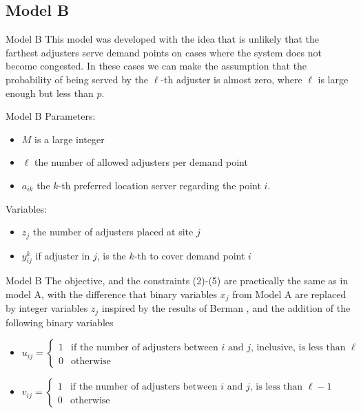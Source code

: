 

\subsection{Model B}
  
\begin{frame}{Model B}
  This model was developed with the idea that is unlikely that
  the farthest adjusters serve demand points on cases where the system does not become congested.
  In these cases we can make the assumption that the probability of being served by the $\ell$-th 
  adjuster is almost zero, where $\ell$ is large enough but less than $p$.

\end{frame}

\begin{frame}{Model B}
  Parameters:
  \begin{itemize}
  \item $M$ is a large integer
  \item $\ell$ the number of allowed adjusters per demand point
  \item $a_{ik}$ the $k$-th preferred location server regarding the point $i$.
  \end{itemize}

  Variables:
  \begin{itemize}
  \item $z_j$ the number of adjusters placed at site $j$
  \item $y_{ij}^k$ if adjuster in $j$, is the $k$-th to cover demand point $i$
  \end{itemize}

\end{frame}

\begin{frame}[allowframebreaks]{Model B}
  The objective, and the constraints (2)-(5) 
  are practically the same as in model A,
  with the difference that binary variables $x_j$ from Model A
  are replaced by integer variables $z_j$ inspired by the results of Berman \cite{berman1987stochastic},
  and the addition of the following binary variables
  {\footnotesize
    \begin{itemize}
    \item $u_{ij} = \begin{cases} 1 & \mbox{if the number of adjusters between } i \mbox{ and } j \mbox{, inclusive, is less than } \ell \\
      0 & \mbox{otherwise}
    \end{cases}$
    \item $v_{ij} = \begin{cases} 1 & \mbox{if the number of adjusters between } i \mbox{ and } j \mbox{, is less than } \ell - 1 \\
      0 & \mbox{otherwise}
    \end{cases}$
    \end{itemize}
  }
\end{frame}

